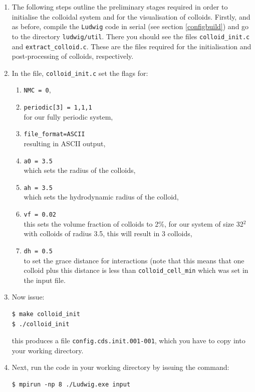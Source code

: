 \documentclass[11pt,twoside,a4paper]{article}
\begin{document}
\begin{enumerate}
\item The following steps outline the preliminary stages required in order to initialise the colloidal system and for the visualisation of colloids. Firstly, and as before, compile the \texttt{Ludwig} code in serial (see section \ref{configbuild}) and go to the directory \texttt{ludwig/util}. There you should see the files \texttt{colloid\_init.c} and \texttt{extract\_colloid.c}. These are the files required for the initialisation and post-processing of colloids, respectively.
\item In the file, \texttt{colloid\_init.c} set the flags for:
\begin{enumerate}
\item \texttt{NMC = 0},
\item \texttt{periodic[3] = {1,1,1}} \\ for our fully periodic system,
\item \texttt{file\_format=ASCII} \\ resulting in ASCII output,
\item \texttt{a0 = 3.5} \\ which sets the radius of the colloids,
\item \texttt{ah = 3.5} \\ which sets the hydrodynamic radius of the colloid,
\item \texttt{vf = 0.02} \\ this sets the volume fraction of colloids to 2\%, for our system of size 32$^2$ with colloids of radius 3.5, this will result in 3 colloids,
\item \texttt{dh = 0.5} \\ to set the grace distance for interactions (note that this means that one colloid plus this distance is less than \texttt{colloid\_cell\_min} which was set in the input file.
\end{enumerate}
\item Now issue: \\
\begin{lstlisting}
$ make colloid_init
$ ./colloid_init
\end{lstlisting}
this produces a file \texttt{config.cds.init.001-001}, which you have to copy into your working directory.

\item Next, run the code in your working directory by issuing the command:
\begin{lstlisting}
$ mpirun -np 8 ./Ludwig.exe input
\end{lstlisting}


\end{enumerate}
\end{document}
